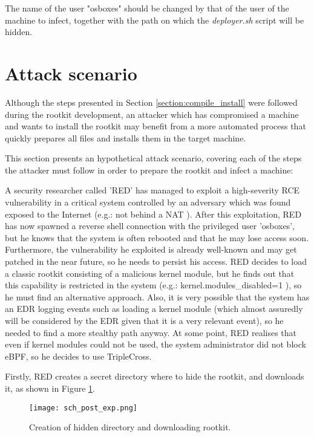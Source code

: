 The name of the user "osboxes" should be changed by that of the user of the machine to infect, together with the path on which the \textit{deployer.sh} script will be hidden.


\section{Attack scenario} \label{section:attack_scenario}
Although the steps presented in Section \ref{section:compile_install} were followed during the rootkit development, an attacker which has compromised a machine and wants to install the rootkit may benefit from a more automated process that quickly prepares all files and installs them in the target machine.

This section presents an hypothetical attack scenario, covering each of the steps the attacker must follow in order to prepare the rootkit and infect a machine:

A security researcher called 'RED' has managed to exploit a high-severity RCE vulnerability in a critical system controlled by an adversary which was found exposed to the Internet (e.g.: not behind a NAT \cite{nat_comptia}). After this exploitation, RED has now spawned a reverse shell connection with the privileged user 'osboxes', but he knows that the system is often rebooted and that he may lose access soon. Furthermore, the vulnerability he exploited is already well-known and may get patched in the near future, so he needs to persist his access. RED decides to load a classic rootkit consisting of a malicious kernel module, but he finds out that this capability is restricted in the system (e.g.: kernel.modules\_disabled=1 \cite{kernel_modules_restrict}), so he must find an alternative approach. Also, it is very possible that the system has an EDR logging events such as loading a kernel module (which almost assuredly will be considered by the EDR given that it is a very relevant event), so he needed to find a more stealthy path anyway. At some point, RED realises that even if kernel modules could not be used, the system administrator did not block eBPF, so he decides to use TripleCross.

Firstly, RED creates a secret directory where to hide the rootkit, and downloads it, as shown in Figure \ref{fig:post_exp}.

\begin{figure}[htbp]
	\centering
	\texttt{[image: sch\_post\_exp.png]}
	\caption{Creation of hidden directory and downloading rootkit.}
	\label{fig:post_exp}
\end{figure}

